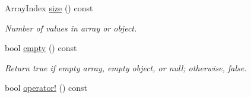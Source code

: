 \begin{DoxyCompactItemize}
\item 
Array\+Index \hyperlink{class_json_1_1_value_a4ca8ee6c48a34ca6c2f131956bab5e05}{size} () const \hypertarget{class_json_1_1_value_a4ca8ee6c48a34ca6c2f131956bab5e05}{}\label{class_json_1_1_value_a4ca8ee6c48a34ca6c2f131956bab5e05}

\begin{DoxyCompactList}\small\item\em Number of values in array or object. \end{DoxyCompactList}\item 
bool \hyperlink{class_json_1_1_value_a99c42d3ff8495dad1e91b43e66553c36}{empty} () const \hypertarget{class_json_1_1_value_a99c42d3ff8495dad1e91b43e66553c36}{}\label{class_json_1_1_value_a99c42d3ff8495dad1e91b43e66553c36}

\begin{DoxyCompactList}\small\item\em Return true if empty array, empty object, or null; otherwise, false. \end{DoxyCompactList}\item 
bool \hyperlink{class_json_1_1_value_a021ab0d15a807fbe051446c9c545ab61}{operator!} () const \hypertarget{class_json_1_1_value_a021ab0d15a807fbe051446c9c545ab61}{}\label{class_json_1_1_value_a021ab0d15a807fbe051446c9c545ab61}


\end{DoxyCompactItemize}
